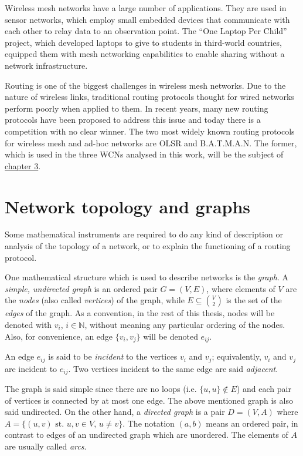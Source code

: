 \documentclass[oneside,openany]{memoir}
\newcommand{\st}{\text{ st. }}
\begin{document}
Wireless mesh networks have a large number of applications.
They are used in sensor networks, which employ small embedded devices that
communicate with each other to relay data to an observation point.
The ``One Laptop Per Child'' project, which developed laptops to give to
students in third-world countries, equipped them with mesh networking
capabilities to enable sharing without a network infrastructure.

Routing is one of the biggest challenges in wireless mesh networks. Due
to the nature of wireless links, traditional routing protocols
thought for wired networks perform poorly when applied to them. In
recent years, many new routing protocols have been proposed to address
this issue and today there is a competition with no clear winner. The
two most widely known routing protocols for wireless mesh and ad-hoc
networks are OLSR and B.A.T.M.A.N. The former, which is used in the three
WCNs analysed in this work, will be the subject of
\hyperref[olsr-survey]{chapter 3}.

\chapter{Network topology and graphs}\label{network-topology-and-graphs}

Some mathematical instruments are required to do any kind of description
or analysis of the topology of a network, or to explain the functioning
of a routing protocol.

One mathematical structure which is used to describe networks is the
\emph{graph}. A \emph{simple, undirected graph} is an ordered pair
$G = (V, E)$, where elements of $V$ are the \emph{nodes} (also called
\emph{vertices}) of the graph, while $E \subseteq \binom{V}{2}$ is the set of the
\emph{edges} of the graph. As a convention, in the rest of this thesis,
nodes will be denoted with $v_i$, $i \in \mathbb{N}$, without meaning any
particular ordering of the nodes. Also, for convenience, an edge
$\{v_i, v_j \}$ will be denoted $e_{ij}$.

An edge $e_{ij}$ is said to be \emph{incident} to the vertices $v_i$ and
$v_j$; equivalently, $v_i$ and $v_j$ are incident to $e_{ij}$. Two
vertices incident to the same edge are said \emph{adjacent}.

The graph is said simple since there are no loops (i.e.
$\{u,u\} \not\in E$) and each pair of vertices is connected by at most
one edge. The above mentioned graph is also said undirected. On the
other hand, a \emph{directed graph} is a pair $D = (V, A)$ where
$A = \{(u,v) \st u,v \in V,\, u \neq v\}$. The notation $(a,b)$ means
an ordered pair, in contrast to edges of an undirected graph
which are unordered. The elements of $A$ are
usually called \emph{arcs}.
\end{document}
